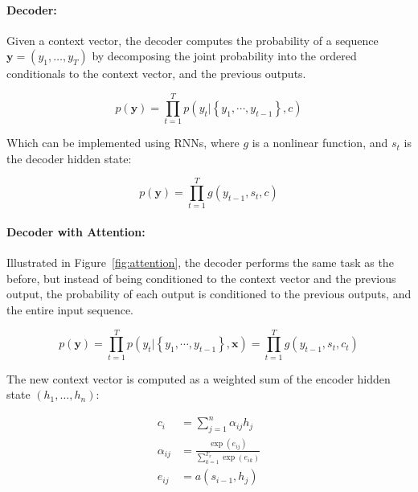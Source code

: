 \paragraph{Decoder:} Given a context vector, the decoder computes the probability of a sequence $\textbf{y} = (y_1, \dots, y_T)$ by decomposing the joint probability into the ordered conditionals to the context vector, and the previous outputs.

\begin{equation}
p(\mathbf{y})=\prod_{t=1}^{T} p\left(y_{t} |\left\{y_{1}, \cdots, y_{t-1}\right\}, c\right)
\end{equation}

Which can be implemented using RNNs, where $g$ is a nonlinear function, and $s_t$ is the decoder hidden state:

\begin{equation}
p(\mathbf{y})=\prod_{t=1}^{T} g\left(y_{t-1}, s_{t}, c\right)
\end{equation}

\paragraph{Decoder with Attention:} Illustrated in Figure~\ref{fig:attention}, the \cite{bahdanau2014neural} decoder performs the same task as the before, but instead of being conditioned to the context vector and the previous output, the probability of each output is conditioned to the previous outputs, and the entire input sequence.


\begin{equation}
p(\mathbf{y})=\prod_{t=1}^{T} p\left(y_{t} |\left\{y_{1}, \cdots, y_{t-1}\right\}, \textbf{x}\right) = \prod_{t=1}^{T} g\left(y_{t-1}, s_{t}, c_t\right)
\end{equation}

The new context vector is computed as a weighted sum of the encoder hidden state $(h_1, \dots, h_n)$: 

\begin{equation}
\begin{split}
    c_{i} & = \sum_{j=1}^{n} \alpha_{i j} h_{j}\\
    \alpha_{i j} &= \frac{\exp \left(e_{i j}\right)}{\sum_{k=1}^{T_{x}} \exp \left(e_{i k}\right)} \\
    e_{i j} &= a\left(s_{i-1}, h_{j}\right)
\end{split}
\end{equation}

